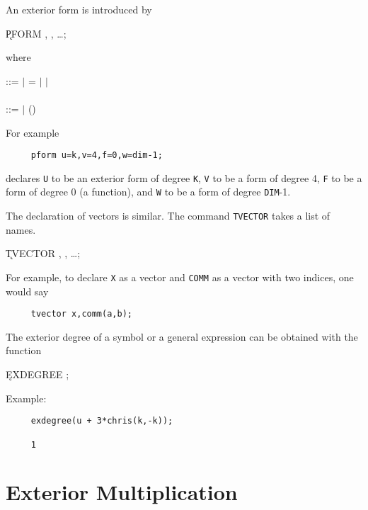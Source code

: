 An exterior form is introduced by\label{PFORM}

\hspace*{2em} \k{PFORM} , , \ldots;

where

\begin{tabbing}
 ::=  $\mid$ = $\mid$   $\mid$ \\
 \\
 ::=  $\mid$ ()
\end{tabbing}

For example

\begin{verbatim}
     pform u=k,v=4,f=0,w=dim-1;
\end{verbatim}

declares {\tt U} to be an exterior form of degree {\tt K}, {\tt V} to be a
form of degree 4, {\tt F} to be a form of degree 0 (a function), and {\tt W}
to be a form of degree {\tt DIM}-1.

The declaration of vectors is similar. The command {\tt TVECTOR}\label{TVECTOR}
takes a list of names.

\hspace*{2em} \k{TVECTOR} , , \ldots;

For example, to declare {\tt X} as a vector and {\tt COMM} as a vector with
two indices, one would say

\begin{verbatim}
     tvector x,comm(a,b);
\end{verbatim}

The exterior degree of a symbol or a general expression can be obtained
with the function \label{EXDEGREE}

\hspace*{2em} \k{EXDEGREE} ;

Example:
\begin{verbatim}
     exdegree(u + 3*chris(k,-k));

     1
\end{verbatim}

\section{Exterior Multiplication}

